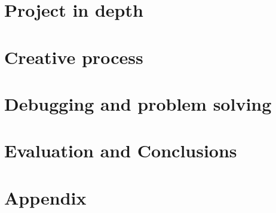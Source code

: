 \documentclass[12pt]{report}
\begin{document}
\chapter{Project in depth}
\label{sec:org3dc1183}
\chapter{Creative process}
\label{sec:org69b5cef}
\chapter{Debugging and problem solving}
\label{sec:orge8abb54}
\chapter{Evaluation and Conclusions}
\label{sec:org4ba246a}
 


\chapter{Appendix}
\label{sec:orgb07a881}
\end{document}
